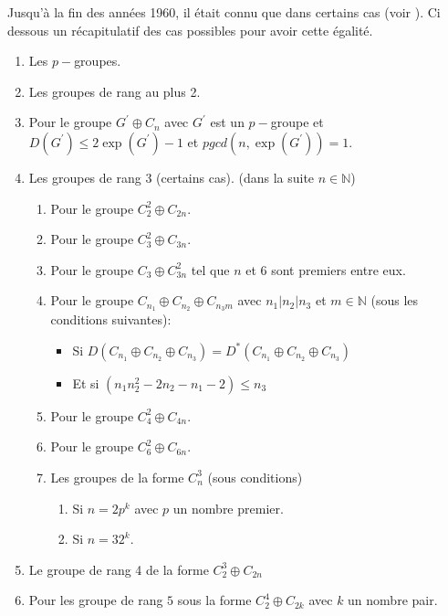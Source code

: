 \documentclass[12pt, openany]{report}
\def \N {\mathbb{N}}
\begin{document}
Jusqu'à la fin des années 1960, il était connu que   dans certains cas (voir ). Ci dessous un récapitulatif des cas possibles pour avoir cette égalité. 
\begin{enumerate}
\item Les $p-$groupes.  
\item Les groupes de rang au plus 2. 
\item Pour le groupe $G^{'} \oplus C_{n}$ avec $G^{'}$ est un $p-$groupe et $D(G^{'}) \le 2 \exp(G^{'}) -1$ et $pgcd(n,\exp(G^{'}))=1$.
\item Les groupes de rang 3 (certains cas). (dans la suite $n \in \N$)
	\begin{enumerate}
	\item Pour le groupe $C_{2}^{2} \oplus C_{2n}$. 
	\item Pour le groupe $C_{3}^{2} \oplus C_{3n}$.
	\item Pour le groupe $C_{3} \oplus C_{3n}^{2}$ tel que $n$ et $6$ sont premiers entre eux. 
	\item Pour le groupe $C_{n_{1}} \oplus C_{n_{2}} \oplus C_{n_{3}m}$ avec $n_{1} \vert n_{2} \vert n_{3}$ et $m \in \N$ (sous les conditions suivantes): 
	
		\begin{itemize}
		\item Si  $D(C_{n_{1}} \oplus C_{n_{2}} \oplus C_{n_{3}})=D^{*}(C_{n_{1}} \oplus C_{n_{2}} \oplus C_{n_{3}}) $
		\item Et si $(n_{1} n_{2}^{2}-2n_{2}-n_{1}-2) \le n_{3} $
		\end{itemize}
	\item Pour le groupe $C_{4}^{2} \oplus C_{4n}$. 
	\item Pour le groupe $C_{6}^{2} \oplus C_{6n}$. 
	\item Les groupes de la forme $C_{n}^{3}$ (sous conditions)
		\begin{enumerate}
		\item Si $n=2 p^{k}$ avec $p$ un nombre premier. 
		\item Si  $n=32^{k}$.
		\end{enumerate}
	\end{enumerate}
\item Le groupe de rang 4 de la forme $C_{2}^{3} \oplus C_{2n}$
\item Pour les groupe de rang $5$ sous la forme  $C_{2}^{4} \oplus C_{2k}$ avec $k$ un nombre pair. 
\end{enumerate}
\end{document}
